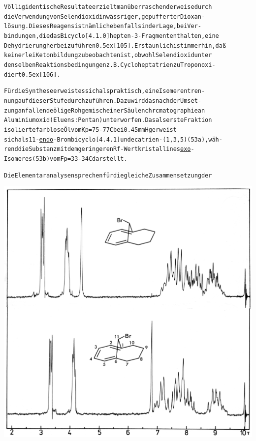 \documentclass[a4paper,11pt]{article}
\begin{document}
\schemestop
\chemnameinit{}
\begin{alltt}

Völlig identische Resultate erzielt man überraschenderweise durch
die Verwendung von Selendioxid in wässriger, gepufferter Dioxan-
lösung. Dieses Reagens ist nämlich ebenfalls in der Lage, bei Ver-
bindungen, die das Bicyclo[4.1.0]hepten-3-Fragment enthalten, eine
Dehydrierung herbeizuführen \raise0.5ex\hbox{[105]}. Erstaunlich ist immerhin, daß
keinerlei Ketonbildung zu beobachten ist, obwohl Selendioxid unter
denselben Reaktionsbedingungen z.B. Cycloheptatrien zu Tropon oxi-
diert \raise0.5ex\hbox{[106]}.

\newpage
{}


Für die Synthese erweist es sich als praktisch, eine Isomerentren-
nung auf dieser Stufe durchzuführen. Dazu wird das nach der Umset-
zung anfallende ölige Rohgemisch einer Säulenchrcmatographie an
Aluminiumoxid (Eluens: Pentan) unterworfen. Das als erste Fraktion
isolierte farblose Öl vom Kp = 75 - 77\degree{}C bei 0.45 mm Hg erweist
sich als 11-\underline{endo}-Brombicyclo[4.4.1]undecatrien-(1‚3,5) (53a), wäh-
rend die Substanz mit dem geringeren Rf-Wert kristallines \underline{exo}-
Isomeres (53b) vom Fp = 33 - 34\degree{}C darstellt.

Die Elementaranalysen sprechen für die gleiche Zusammensetzung der


\end{alltt}
\hspace*{-0.25cm}\includegraphics[width=14.275cm]{NMR_023}
\end{document}
